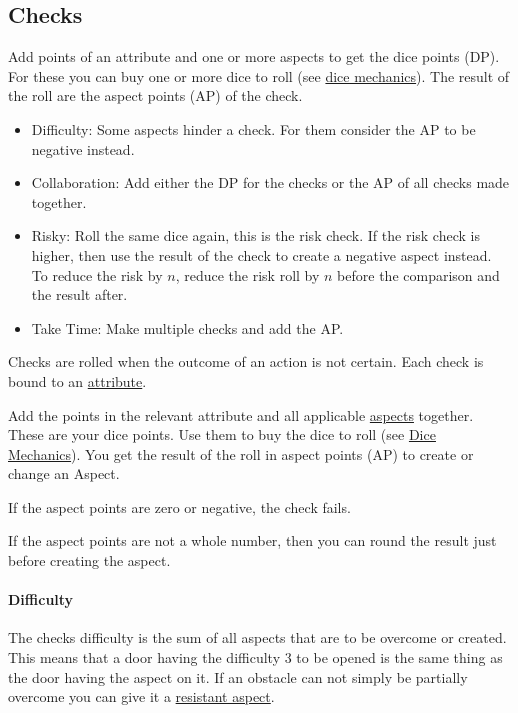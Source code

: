 \documentclass[11pt]{article}
\begin{document}
{\subsection{Checks}
\label{sec:org09241a8}
\begin{short}
Add points of an attribute and one or more aspects to get the dice points (DP). For these you can buy one or more dice to roll (see \hyperref[sec:orge9ea528]{dice mechanics}). The result of the roll are the aspect points (AP) of the check.
\begin{itemize}
\item Difficulty: Some aspects hinder a check. For them consider the AP to be negative instead.
\item Collaboration: Add either the DP for the checks or the AP of all checks made together.
\item Risky: Roll the same dice again, this is the risk check. If the risk check is higher, then use the result of the check to create a negative aspect instead. To reduce the risk by \(n\), reduce the risk roll by \(n\) before the comparison and the result after.
\item Take Time: Make multiple checks and add the AP.
\end{itemize}
\end{short}

Checks are rolled when the outcome of an action is not certain. Each check is bound to an \hyperref[sec:orgcd0fde3]{attribute}.

Add the points in the relevant attribute and all applicable \hyperref[sec:org48de6b9]{aspects} together. These are your dice points. Use them to buy the dice to roll (see \hyperref[sec:orge9ea528]{Dice Mechanics}). You get the result of the roll in aspect points (AP) to create or change an Aspect.

If the aspect points are zero or negative, the check fails.

If the aspect points are not a whole number, then you can round the result just before creating the aspect.
\paragraph*{Difficulty}
\label{sec:orge4e902f}
The checks difficulty is the sum of all aspects that are to be overcome or created. This means that a door having the difficulty 3 to be opened is the same thing as the door having the aspect  on it. If an obstacle can not simply be partially overcome you can give it a \hyperref[sec:org034cc47]{resistant aspect}.

}
\end{document}
